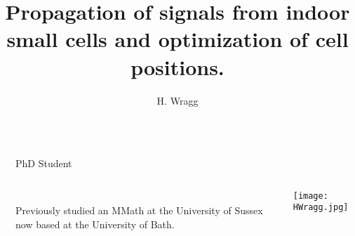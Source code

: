 \documentclass[final]{beamer}
\title{Propagation of signals from indoor small cells and optimization of cell positions.} %
\author{H. Wragg} %
\institute{University of Bath} %
\theoremstyle{plain}
\theoremstyle{definition}
\theoremstyle{remark}
\newlength{\sepwid}
\newlength{\onecolwid}
\begin{document}

\setlength{\belowcaptionskip}{2ex} %
\setlength{\belowdisplayshortskip}{2ex} %

\begin{frame}[t] %

\begin{columns}[t] %

\begin{column}{\sepwid}\end{column} %

\begin{column}{\onecolwid} %


  
    \begin{mdframed}[backgroundcolor=white, userdefinedwidth=0.999999\linewidth]
    \centering
    \center
  
    \end{mdframed}
    \vspace{1.5cm}
    
\begin{alertblock}{PhD Student}
\begin{columns} \begin{column}{0.75\linewidth}
\textbf{\insertauthor} \hspace{1cm}
 \\
Previously studied an MMath at the University of Sussex now based at the University of Bath.
\end{column}
\begin{column}{0.25\linewidth}
\texttt{[image: HWragg.jpg]}
\end{column}
\end{columns}
\end{alertblock}


\end{column}
\end{columns}
\end{frame}
\end{document}
